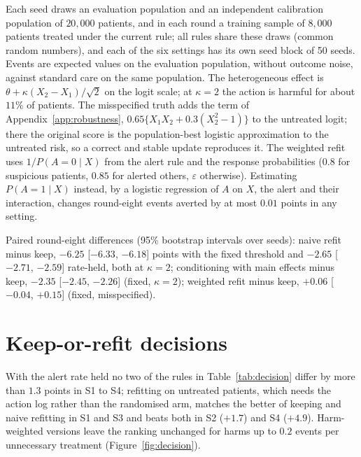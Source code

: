 \documentclass[letterpaper]{article} %
\begin{document}
Each seed draws an evaluation population and an independent calibration
population of $20{,}000$ patients, and in each round a training sample of
$8{,}000$ patients treated under the current rule; all rules share these draws
(common random numbers), and each of the six settings has its own seed block
of 50 seeds. Events are expected values on the evaluation population, without
outcome noise, against standard care on the same population. The
heterogeneous effect is $\theta + \kappa (X_2 - X_1)/\sqrt{2}$ on the logit
scale; at $\kappa = 2$ the action is harmful for about $11\%$ of patients. The
misspecified truth adds the term of Appendix~\ref{app:robustness}, $0.65\{X_1X_2 + 0.3(X_2^2 - 1)\}$ to the
untreated logit; there the original score is the population-best logistic
approximation to the untreated risk, so a correct and stable update
reproduces it. The weighted refit uses $1/P(A = 0 \mid X)$ from the alert rule
and the response probabilities ($0.8$ for suspicious patients, $0.85$ for
alerted others, $\varepsilon$ otherwise). Estimating $P(A = 1 \mid X)$ instead,
by a logistic regression of $A$ on $X$, the alert and their interaction, changes
round-eight events averted by at most $0.01$ points in any setting.


Paired round-eight differences (95\% bootstrap intervals over seeds): naive
refit minus keep, $-6.25$ [$-6.33$, $-6.18$] points with the fixed threshold
and $-2.65$ [$-2.71$, $-2.59$] rate-held, both at $\kappa = 2$; conditioning
with main effects minus keep, $-2.35$ [$-2.45$, $-2.26$] (fixed, $\kappa = 2$);
weighted refit minus keep, $+0.06$ [$-0.04$, $+0.15$] (fixed, misspecified).

\section{Keep-or-refit decisions}
\label{app:decision}
With the alert rate held no two of the rules in
Table~\ref{tab:decision} differ by more than
$1.3$ points in S1 to S4; refitting on untreated patients, which needs
the action log rather than the randomised arm, matches the better of keeping
and naive refitting in S1 and S3 and beats both in S2 ($+1.7$) and S4
($+4.9$). Harm-weighted versions leave the ranking unchanged for harms up to
$0.2$ events per unnecessary treatment (Figure~\ref{fig:decision}).
\end{document}
